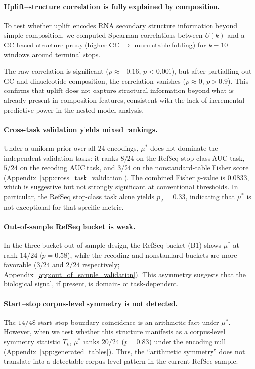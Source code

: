 \paragraph{Uplift--structure correlation is fully explained by composition.}
To test whether uplift encodes RNA secondary structure information beyond simple composition, we computed Spearman correlations between $\overline{U}(k)$ and a GC-based structure proxy (higher GC $\to$ more stable folding) for $k=10$ windows around terminal stops.

The raw correlation is significant ($\rho\approx -0.16$, $p<0.001$), but after partialling out GC and dinucleotide composition, the correlation vanishes ($\rho\approx 0$, $p>0.9$).
This confirms that uplift does not capture structural information beyond what is already present in composition features, consistent with the lack of incremental predictive power in the nested-model analysis.

\paragraph{Cross-task validation yields mixed rankings.}
Under a uniform prior over all $24$ encodings, $\mu^\ast$ does not dominate the independent validation tasks:
it ranks $8/24$ on the RefSeq stop-class AUC task, $5/24$ on the recoding AUC task, and $3/24$ on the nonstandard-table Fisher score (Appendix~\ref{app:cross_task_validation}).
The combined Fisher $p$-value is $0.0833$, which is suggestive but not strongly significant at conventional thresholds.
In particular, the RefSeq stop-class task alone yields $p_A=0.33$, indicating that $\mu^\ast$ is not exceptional for that specific metric.

\paragraph{Out-of-sample RefSeq bucket is weak.}
In the three-bucket out-of-sample design, the RefSeq bucket (B1) shows $\mu^\ast$ at rank $14/24$ ($p=0.58$), while the recoding and nonstandard buckets are more favorable ($3/24$ and $2/24$ respectively; Appendix~\ref{app:out_of_sample_validation}).
This asymmetry suggests that the biological signal, if present, is domain- or task-dependent.

\paragraph{Start--stop corpus-level symmetry is not detected.}
The $14/48$ start--stop boundary coincidence is an arithmetic fact under $\mu^\ast$.
However, when we test whether this structure manifests as a corpus-level symmetry statistic $T_k$, $\mu^\ast$ ranks $20/24$ ($p=0.83$) under the encoding null (Appendix~\ref{app:generated_tables}).
Thus, the ``arithmetic symmetry'' does not translate into a detectable corpus-level pattern in the current RefSeq sample.

